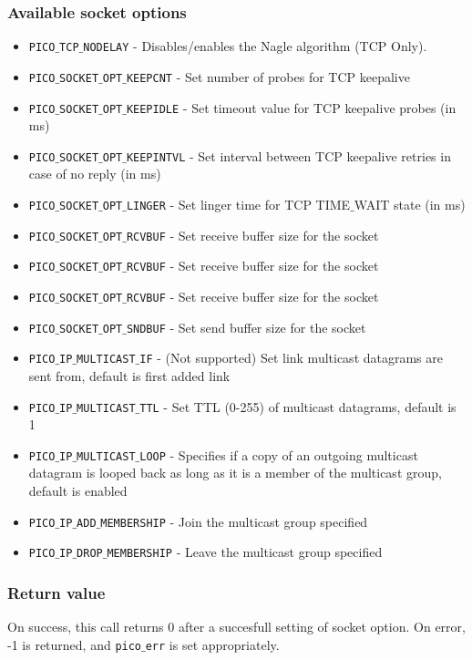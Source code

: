 \subsubsection*{Available socket options}
\begin{itemize}[noitemsep]
\item \texttt{PICO$\_$TCP$\_$NODELAY} - Disables/enables the Nagle algorithm (TCP Only). 
\item \texttt{PICO$\_$SOCKET$\_$OPT$\_$KEEPCNT} - Set number of probes for TCP keepalive
\item \texttt{PICO$\_$SOCKET$\_$OPT$\_$KEEPIDLE} - Set timeout value for TCP keepalive probes (in ms)
\item \texttt{PICO$\_$SOCKET$\_$OPT$\_$KEEPINTVL} - Set interval between TCP keepalive retries in case of no reply (in ms)
\item \texttt{PICO$\_$SOCKET$\_$OPT$\_$LINGER} - Set linger time for TCP TIME$\_$WAIT state (in ms)
\item \texttt{PICO$\_$SOCKET$\_$OPT$\_$RCVBUF} - Set receive buffer size for the socket
\item \texttt{PICO$\_$SOCKET$\_$OPT$\_$RCVBUF} - Set receive buffer size for the socket
\item \texttt{PICO$\_$SOCKET$\_$OPT$\_$RCVBUF} - Set receive buffer size for the socket
\item \texttt{PICO$\_$SOCKET$\_$OPT$\_$SNDBUF} - Set send buffer size for the socket 
\item \texttt{PICO$\_$IP$\_$MULTICAST$\_$IF} - (Not supported) Set link multicast datagrams are sent from, default is first added link
\item \texttt{PICO$\_$IP$\_$MULTICAST$\_$TTL} - Set TTL (0-255) of multicast datagrams, default is 1
\item \texttt{PICO$\_$IP$\_$MULTICAST$\_$LOOP} - Specifies if a copy of an outgoing multicast datagram is looped back as long as it is a member of the multicast group, default is enabled
\item \texttt{PICO$\_$IP$\_$ADD$\_$MEMBERSHIP} - Join the multicast group specified
\item \texttt{PICO$\_$IP$\_$DROP$\_$MEMBERSHIP} - Leave the multicast group specified
\end{itemize}

\subsubsection*{Return value}
On success, this call returns 0 after a succesfull setting of socket option.
On error, -1 is returned, and \texttt{pico$\_$err} is set appropriately.

